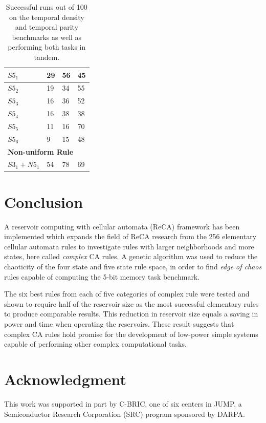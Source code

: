 \documentclass{elsarticle}
\begin{document}
\begin{multicols}{2}
\begin{table}[H]
\begin{tabular}{|l|l|l|l|}
\hline
$S5_{1}$ & 29 & 56 & 45 \\ \hline
$S5_{2}$ & 19 & 34 & 55 \\ \hline
$S5_{3}$ & 16 & 36 & 52 \\ \hline
$S5_{4}$ & 16 & 38 & 38 \\ \hline
$S5_{5}$ & 11 & 16 & 70 \\ \hline
$S5_{6}$ & 9 & 15 & 48 \\ \hline
\multicolumn{4}{|l|}{\textbf{Non-uniform Rule}} \\ \hline
$S3_1 +  N5_1$ & 54 & 78 & 69 \\ \hline
\end{tabular}
\caption{Successful runs out of 100 on the temporal density and temporal parity 
   benchmarks as well as performing both tasks in tandem.
}
\label{table:results_temp_dens}
\end{table}

\section{Conclusion}\label{conclusion}
A reservoir computing with cellular automata (ReCA) framework has been 
implemented which expands the field of ReCA research from the 256 elementary 
cellular automata rules to investigate rules with larger neighborhoods and more 
states, here called \textit{complex} CA rules. A genetic algorithm was used to 
reduce the chaoticity of the four state and five state rule space, in order to 
find \textit{edge of chaos} rules capable of computing the 5-bit memory task 
benchmark. \par The six best rules from each of five categories of complex rule 
were tested and shown to require half of the reservoir size as the most 
successful elementary rules to produce comparable results. This reduction in 
reservoir size equals a saving in power and time when operating the reservoirs.  
These result suggests that complex CA rules hold promise for the development of 
low-power simple systems capable of performing other complex computational 
tasks.  


\section{Acknowledgment}
This work was supported in part by C-BRIC, one of six centers in JUMP, a 
Semiconductor Research Corporation (SRC) program sponsored by DARPA.



\end{multicols}
\end{document}
